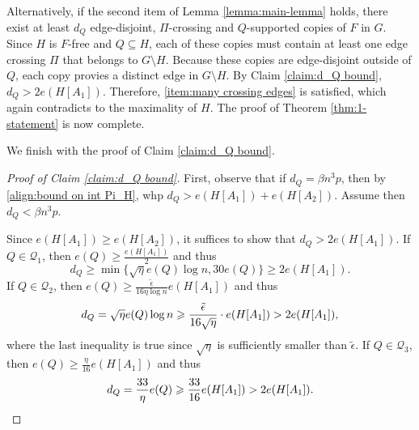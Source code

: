\documentclass[11pt,a4paper,oneside,reqno]{amsart}
\newcommand{\Gnp}{G_{n, p}^{(3)}}
\newcommand{\cC}{\mathcal{C}}
\newcommand{\cQ}{\mathcal{Q}}
\newcommand{\1}{\mathbbm{1}} %
\renewcommand{\ge}{\geqslant}
\newcommand{\IH}[1]{{\color{blue}{(Comment: #1)}}}
\newcommand{\cQL}{\cQ^{\mathrm{low}}}
\begin{document}
Alternatively, if the second item of Lemma \ref{lemma:main-lemma} holds, there exist at least $d_Q$ edge-disjoint, $\Pi$-crossing and $Q$-supported copies of $F$ in $G$. Since $H$ is $F$-free and $Q \subseteq H$, each of these copies must contain at least one edge crossing $\Pi$ that belongs to $G \setminus H$. Because these copies are edge-disjoint outside of $Q$, each copy provies a distinct edge in $G \setminus H$. By Claim \ref{claim:d_Q bound}, $d_Q > 2e(H[A_1])$. Therefore, \ref{item:many crossing edges} is satisfied, which again contradicts to the maximality of $H$. The proof of Theorem \ref{thm:1-statement} is now complete.

We finish with the proof of Claim \ref{claim:d_Q bound}.
\begin{proof}[Proof of Claim \ref{claim:d_Q bound}]
    First, observe that if $d_Q = \beta n^3 p$, then by \eqref{align:bound on int Pi_H}, whp $d_Q > e(H[A_1]) + e(H[A_2])$. Assume then $d_Q < \beta n^3 p$.

    Since $e(H[A_1]) \ge e(H[A_2])$, it suffices to show that $d_Q > 2e(H[A_1])$. If $Q \in \cQ_1$, then $e(Q) \ge \frac{e(H[A_1])}{2}$ and thus
\[
    d_Q \ge \min\{\sqrt{\eta} e(Q) \log n, 30 e(Q)\} \ge 2e(H[A_1]).
\]
 If $Q \in \cQ_2$, then $e(Q) \ge \frac{\tilde{\epsilon}}{16 \eta \log n} e(H[A_1])$ and thus
\[
    d_Q = \sqrt{\eta} e(Q) \log n \ge \frac{\Tilde{\epsilon}}{16 \sqrt{\eta}} \cdot e(H[A_1]) > 2e(H[A_1]),
\]
where the last inequality is true since $\sqrt{\eta}$ is sufficiently smaller than $\tilde{\epsilon}$. If $Q \in \cQ_3$, then $e(Q) \ge \frac{\eta}{16} e(H[A_1])$ and thus
\[
    d_Q = \frac{33}{\eta} e(Q) \ge \frac{33}{16} e(H[A_1]) > 2e(H[A_1]). \qedhere
\]
\end{proof}
%
%    
\end{document}
